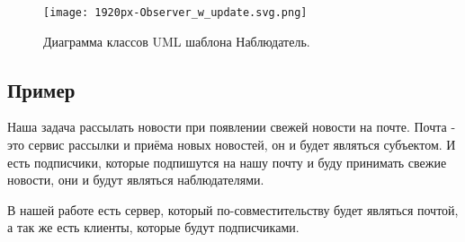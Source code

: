\begin{figure}[H]
	\begin{center}
		\texttt{[image: 1920px-Observer\_w\_update.svg.png]}
		\caption{Диаграмма классов UML шаблона Наблюдатель.}
	\end{center}
\end{figure}

\subsection{Пример}

Наша задача рассылать новости при появлении свежей новости на почте.
Почта - это сервис рассылки и приёма новых новостей, он и будет являться субъектом.
И есть подписчики, которые подпишутся на нашу почту и буду принимать свежие новости, они и будут являться наблюдателями.

В нашей работе есть сервер, который по-совместительству будет являться почтой, а так же есть клиенты, которые будут подписчиками.
